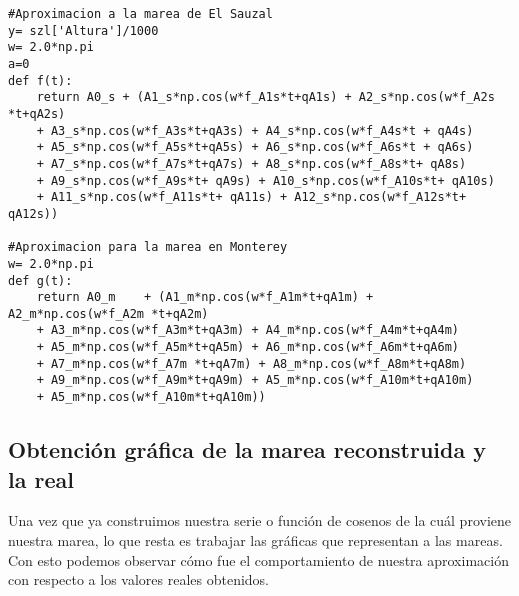 \begin{verbatim}
#Aproximacion a la marea de El Sauzal
y= szl['Altura']/1000
w= 2.0*np.pi
a=0
def f(t):
    return A0_s + (A1_s*np.cos(w*f_A1s*t+qA1s) + A2_s*np.cos(w*f_A2s *t+qA2s)
	+ A3_s*np.cos(w*f_A3s*t+qA3s) + A4_s*np.cos(w*f_A4s*t + qA4s)
	+ A5_s*np.cos(w*f_A5s*t+qA5s) + A6_s*np.cos(w*f_A6s*t + qA6s)
	+ A7_s*np.cos(w*f_A7s*t+qA7s) + A8_s*np.cos(w*f_A8s*t+ qA8s)
	+ A9_s*np.cos(w*f_A9s*t+ qA9s) + A10_s*np.cos(w*f_A10s*t+ qA10s) 
	+ A11_s*np.cos(w*f_A11s*t+ qA11s) + A12_s*np.cos(w*f_A12s*t+ qA12s))

#Aproximacion para la marea en Monterey
w= 2.0*np.pi
def g(t):
    return A0_m    + (A1_m*np.cos(w*f_A1m*t+qA1m) + A2_m*np.cos(w*f_A2m *t+qA2m) 
	+ A3_m*np.cos(w*f_A3m*t+qA3m) + A4_m*np.cos(w*f_A4m*t+qA4m) 
	+ A5_m*np.cos(w*f_A5m*t+qA5m) + A6_m*np.cos(w*f_A6m*t+qA6m) 
	+ A7_m*np.cos(w*f_A7m *t+qA7m) + A8_m*np.cos(w*f_A8m*t+qA8m) 
	+ A9_m*np.cos(w*f_A9m*t+qA9m) + A5_m*np.cos(w*f_A10m*t+qA10m)
	+ A5_m*np.cos(w*f_A10m*t+qA10m))
\end{verbatim}

\subsection{Obtención gráfica de la marea reconstruida y la real}
\noindent Una vez que ya construimos nuestra serie o función de cosenos de la cuál proviene nuestra marea, lo que resta es trabajar las gráficas que representan a las mareas. Con esto podemos observar cómo fue el comportamiento de nuestra aproximación con respecto a los valores reales obtenidos.


